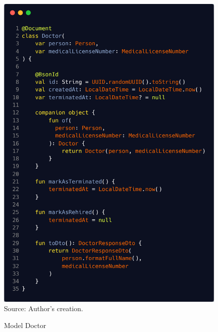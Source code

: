 \begin{figure}[H]
	\centering
	\caption{Model Doctor}
	\includegraphics[width=1\linewidth]{figures/doctor}
	\label{fig:doctor}
	\footnotesize Source: Author's creation.
\end{figure}

